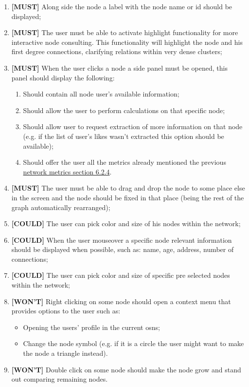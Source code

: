 \begin{enumerate}
    \item \textbf{[MUST]} Along side the node a label with the node name or id should be displayed;
    \item \textbf{[MUST]} The user must be able to activate highlight functionality for more interactive node consulting. This functionality will highlight the node and his first degree connections, clarifying relations within very dense clusters; %
    \item \textbf{[MUST]} When the user clicks a node a side panel must be opened, this panel should display the following:
    \begin{enumerate}
        \item Should contain all node user's available information;
        \item Should allow the user to perform calculations on that specific node;
        \item Should allow user to request extraction of more information on that node (e.g. if the list of user's likes wasn't extracted this option should be available);
        \item Should offer the user all the metrics already mentioned the previous \hyperref[subsec:networkmetrics]{network metrics section 6.2.4}.
    \end{enumerate}
    \item \textbf{[MUST]} The user must be able to drag and drop the node to some place else in the screen and the node should be fixed in that place (being the rest of the graph automatically rearranged); %
    \item \textbf{[COULD]} The user can pick color and size of his nodes within the network;
    \item \textbf{[COULD]} When the user mouseover a specific node relevant information should be displayed when possible, such as: name, age, address, number of connections;
    \item \textbf{[COULD]} The user can pick color and size of specific pre selected nodes within the network;
    \item \textbf{[WON'T]} Right clicking on some node should open a context menu that provides options to the user such as:
    \begin{itemize}
        \item Opening the users' profile in the current \glspl{osn};
        \item Change the node symbol (e.g. if it is a circle the user might want to make the node a triangle instead). %
    \end{itemize}
    \item \textbf{[WON'T]} Double click on some node should make the node grow and stand out comparing remaining nodes. %
\end{enumerate}


